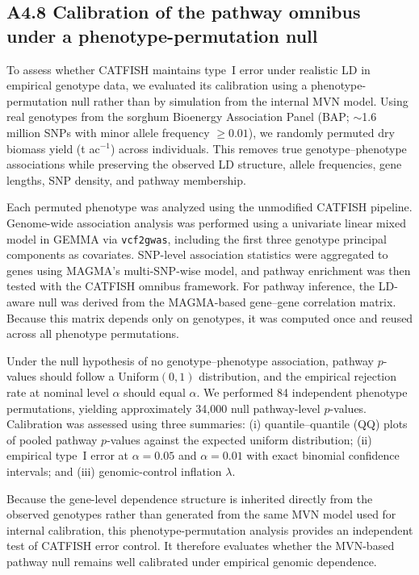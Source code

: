 \documentclass[unnumsec,webpdf,contemporary,large]{oup-authoring-template}%
\theoremstyle{thmstyleone}%
\theoremstyle{thmstyletwo}%
\theoremstyle{thmstylethree}%
\begin{document}
\begin{appendices}
\subsection{A4.8 Calibration of the pathway omnibus under a phenotype-permutation null}

To assess whether CATFISH maintains type~I error under realistic LD in empirical genotype data, we evaluated its calibration using a phenotype-permutation null rather than by simulation from the internal MVN model. Using real genotypes from the sorghum Bioenergy Association Panel (BAP; $\sim$1.6 million SNPs with minor allele frequency $\geq 0.01$), we randomly permuted dry biomass yield (t ac$^{-1}$) across individuals. This removes true genotype--phenotype associations while preserving the observed LD structure, allele frequencies, gene lengths, SNP density, and pathway membership.

Each permuted phenotype was analyzed using the unmodified CATFISH pipeline. Genome-wide association analysis was performed using a univariate linear mixed model in GEMMA via \texttt{vcf2gwas}, including the first three genotype principal components as covariates. SNP-level association statistics were aggregated to genes using MAGMA's multi-SNP-wise model, and pathway enrichment was then tested with the CATFISH omnibus framework. For pathway inference, the LD-aware null was derived from the MAGMA-based gene--gene correlation matrix. Because this matrix depends only on genotypes, it was computed once and reused across all phenotype permutations.

Under the null hypothesis of no genotype--phenotype association, pathway $p$-values should follow a Uniform$(0,1)$ distribution, and the empirical rejection rate at nominal level $\alpha$ should equal $\alpha$. We performed 84 independent phenotype permutations, yielding approximately 34{,}000 null pathway-level $p$-values. Calibration was assessed using three summaries: (i) quantile--quantile (QQ) plots of pooled pathway $p$-values against the expected uniform distribution; (ii) empirical type~I error at $\alpha=0.05$ and $\alpha=0.01$ with exact binomial confidence intervals; and (iii) genomic-control inflation $\lambda$.

Because the gene-level dependence structure is inherited directly from the observed genotypes rather than generated from the same MVN model used for internal calibration, this phenotype-permutation analysis provides an independent test of CATFISH error control. It therefore evaluates whether the MVN-based pathway null remains well calibrated under empirical genomic dependence.



\end{appendices}
\end{document}
